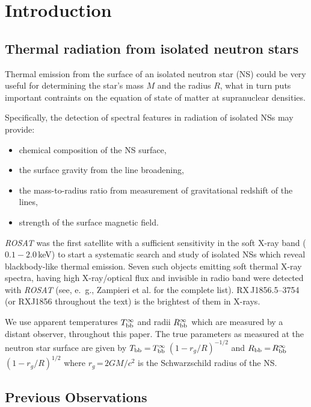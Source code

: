 \documentclass[twocolumn]{aa}
\newcommand{\modi}[1]{{#1}}
\begin{document}
\section{Introduction}

\subsection{Thermal radiation from isolated neutron stars}

Thermal emission from the surface of an isolated neutron 
star (NS) could be very useful  for determining the star's 
mass $M$  and the radius $R$, what in turn puts important 
contraints on the equation of state of matter at supranuclear 
densities. 

Specifically, the detection of spectral features in radiation
of isolated NSs may provide:
\begin{itemize}
\item  
chemical composition of the NS surface,
\item  the surface gravity from the line broadening,
\item  
the mass-to-radius ratio from measurement of 
gravitational redshift of the lines,
\item
strength of the surface magnetic field.
\end{itemize}


{\it ROSAT}  was the first satellite with a sufficient sensitivity
in the soft X-ray band ($0.1-2.0$\,keV) to start a systematic 
search and study of isolated NSs which reveal blackbody-like 
thermal emission.
Seven such objects emitting soft thermal X-ray spectra, having
high X-ray/optical flux and invisible in radio band
were detected with {\em ROSAT} (see, e.~g., Zampieri et al. \cite{Zametal01} 
for the complete list).
RX\,J1856.5--3754 (or RXJ1856 throughout the text) is the brightest 
of them in X-rays.

\modi{
We use apparent temperatures $T^{\infty}_{\rm bb}$ and radii
$R^{\infty}_{\rm bb}$ which are measured by a distant observer,
throughout this paper. 
The true parameters as measured at the neutron star surface are given 
by   $T_{\rm bb}$\,=\,$T^{\infty}_{\rm bb}$\,$(1-r_g/R)^{-1/2}$
and  $R_{\rm bb}$\,=\,$R^{\infty}_{\rm bb}$\,$(1-r_g/R)^{1/2}$
where $r_g$\,=\,$2GM/c^2$ is the Schwarzschild radius of the 
NS.
}

\subsection{Previous Observations}
\end{document}

